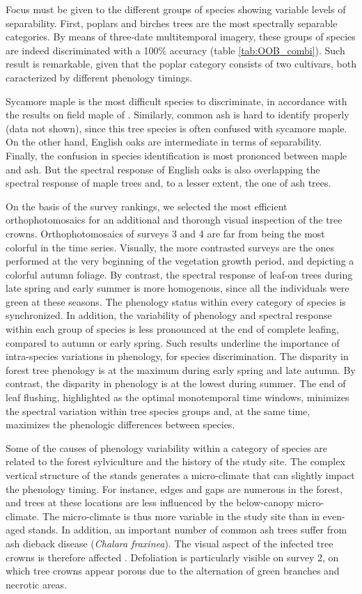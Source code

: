 \documentclass[remotesensing,article,submit,moreauthors,pdftex,12pt,a4paper]{mdpi} %
\begin{document}
Focus must be given to the different groups of species showing variable levels of separability. 
First, poplars and birches trees are the most spectrally separable categories. 
By means of three-date multitemporal imagery, these groups of species are indeed discriminated with a 100\% accuracy (table \ref{tab:OOB_combi}). 
Such result is remarkable, given that the poplar category consists of two cultivars, both caracterized by different phenology timings. 

Sycamore maple is the most difficult species to discriminate, in accordance with the results on field maple of \citeauthor{hill_mapping_2010} \cite{hill_mapping_2010}. 
Similarly, common ash is hard to identify properly (data not shown), since this tree species is often confused with sycamore maple. 
On the other hand, English oaks are intermediate in terms of separability. 
Finally, the confusion in species identification is most prononced between maple and ash. 
But the spectral response of English oaks is also overlapping the spectral response of maple trees and, to a lesser extent, the one of ash trees. 

On the basis of the survey rankings, we selected the most efficient orthophotomosaics for an additional and thorough visual inspection of the tree crowns. 
Orthophotomosaics of surveys 3 and 4 are far from being the most colorful in the time series. 
Visually, the more contrasted surveys are the ones performed at the very beginning of the vegetation growth period, and depicting a colorful autumn foliage. 
By contrast, the spectral response of leaf-on trees during late spring and early summer is more homogenous, since all the individuals were green at these seasons. 
The phenology status within every category of species is synchronized. 
In addition, the variability of phenology and spectral response within each group of species is less pronounced at the end of complete leafing, compared to autumn or early spring. 
Such results underline the importance of intra-species variations in phenology, for species discrimination.
The disparity in forest tree phenology is at the maximum during early spring and late autumn. 
By contrast, the disparity in phenology is at the lowest during summer. 
The end of leaf flushing, highlighted as the optimal monotemporal time windows, minimizes the spectral variation within tree species groups and, at the same time, maximizes the phenologic differences between species.

Some of the causes of phenology variability within a category of species are related to the forest sylviculture and the history of the study site. 
The complex vertical structure of the stands generates a micro-climate that can slightly impact the phenology timing. 
For instance, edges and gaps are numerous in the forest, and trees at these locations are less influenced by the below-canopy micro-climate. 
The micro-climate is thus more variable in the study site than in even-aged stands. 
In addition, an important number of common ash trees suffer from ash dieback disease (\textit{Chalara fraxinea}). 
The visual aspect of the infected tree crowns is therefore affected \cite{waser}. 
Defoliation is particularly visible on survey 2, on which tree crowns appear porous due to the alternation of green branches and necrotic areas. 
\end{document}
